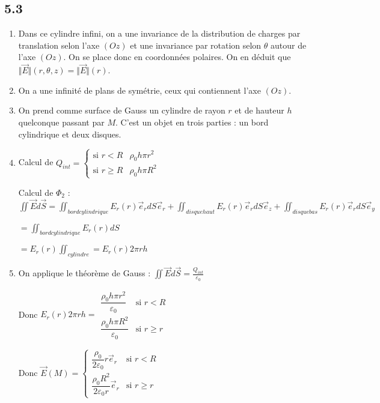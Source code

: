 \documentclass[a4paper,12pt]{book}
\begin{document}
\subsection{5.3}
\begin{enumerate}
\item Dans ce cylindre infini, on a une invariance de la distribution de charges par translation selon l'axe $(Oz)$ et une invariance par rotation selon $\theta$ autour de l'axe $(Oz)$. On se place donc en coordonnées polaires. On en déduit que $\Vert\vec{E}\Vert(r,\theta,z) = \Vert\vec{E}\Vert(r)$.
\item On a une infinité de plans de symétrie, ceux qui contiennent l'axe $(Oz)$.
\item On prend comme surface de Gauss un cylindre de rayon $r$ et de hauteur $h$ quelconque passant par $M$. C'est un objet en trois parties : un bord cylindrique et deux disques.
\item Calcul de $Q_{int} = \left\{\begin{array}{rl} \text{si $r<R$} & \rho_0h\pi r^2 \\ \text{si $r\geq R$} & \rho_0h\pi R^2 \end{array}\right.$
\par Calcul de $\varPhi_2$ : $\iint \vec{E}d\vec{S} = \iint_{bordcylindrique}E_r(r)\vec{e}_rdS\vec{e}_r + \iint_{disquehaut} E_r(r)\vec{e}_rdS\vec{e}_z + \iint_{disquebas}E_r(r)\vec{e}_rdS\vec{e}_y$
\par $ = \iint_{bordcylindrique} E_r(r)dS$ \par $ = E_r(r)\iint_{cylindre} = E_r(r)2\pi rh$
\item On applique le théorème de Gauss : $\iint\vec{E}d\vec{S} = \frac{Q_{int}}{\varepsilon_0}$
\par Donc $E_r(r) 2\pi rh = \begin{array}{rl} \dfrac{\rho_0h\pi r^2}{\varepsilon_0} & \text{si $r<R$} \\ \dfrac{\rho_0 h\pi R^2}{\varepsilon_0} & \text{si $r\geq r$} \end{array}$
\par Donc $\vec{E}(M) = \left\{\begin{array}{rl} \dfrac{\rho_0}{2\varepsilon_0}r\vec{e}_r & \text{si $r<R$} \\ \dfrac{\rho_0R^2}{2\varepsilon_0 r}\vec{e}_r & \text{si $r\geq r$} \end{array}\right.$
\end{enumerate}
\end{document}
